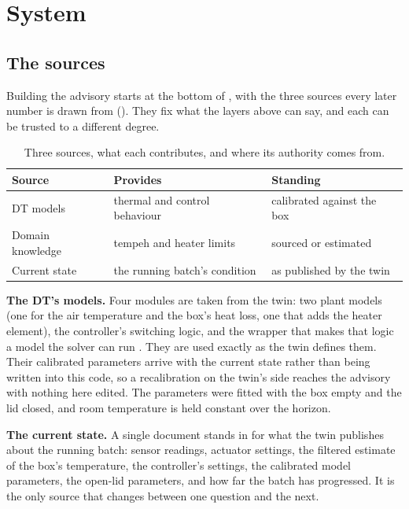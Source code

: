   \section{System}
  \label{sec:system}

  \subsection{The sources}
  \label{sec:sources}

  Building the advisory starts at the bottom of , with the three sources
  every later number is drawn from (). They fix what the layers above can say,
  and each can be trusted to a different degree.

  \begin{table}[htbp]
      \centering
      \begin{tabular}{@{}lll@{}}
      \toprule
      \textbf{Source} & \textbf{Provides} & \textbf{Standing} \\
      \midrule
      DT models & thermal and control behaviour & calibrated against the box \\
      Domain knowledge & tempeh and heater limits & sourced or estimated \\
      Current state & the running batch's condition & as published by the twin \\
      \bottomrule
      \end{tabular}
      \caption{Three sources, what each contributes, and where its authority comes from.}
      \label{tab:sources}
  \end{table}

  \textbf{The DT's models.} Four modules are taken from the twin: two plant models (one
  for the air temperature and the box's heat loss, one that adds the heater element), the
  controller's switching logic, and the wrapper that makes that logic a model the solver can run
  \cite{gomes2025incubator}. They are used exactly as the twin defines them. Their calibrated
  parameters arrive with the current state rather than being written into this code, so a
  recalibration on the twin's side reaches the advisory with nothing here edited. The parameters were fitted
  with the box empty and the lid closed, and room temperature is held constant over the horizon.

  \textbf{The current state.} A single document stands in for what the twin publishes about the
  running batch: sensor readings, actuator settings, the filtered estimate of the box's
  temperature, the controller's settings, the calibrated model parameters, the open-lid parameters,
  and how far the batch has progressed. It is the only source that changes between one question
  and the next.

